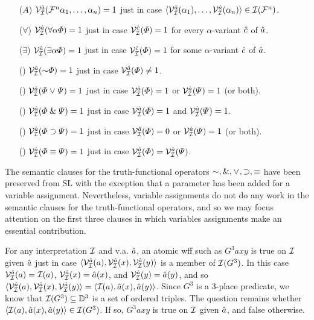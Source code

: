 \begin{enumerate}[labelsep=.15in]
  \item[($A$)] $\mathcal{V}_{\mathcal{I}}^{\hat{a}}(\mathcal{F}^n\alpha_1,\ldots,\alpha_n)=1$ just in case $\langle\mathcal{V}_{\mathcal{I}}^{\hat{a}}{(\alpha_1)},\ldots,\mathcal{V}_{\mathcal{I}}^{\hat{a}}{(\alpha_n)}\rangle\in\mathcal{I}(\mathcal{F}^n)$.
  \item[(\hspace{1pt}$\forall$\hspace{1pt})] $\mathcal{V}_{\mathcal{I}}^{\hat{a}}(\forall \alpha\varPhi)=1$ just in case $\mathcal{V}_{\mathcal{I}}^{\hat{c}}(\varPhi)=1$ for every $\alpha$-variant $\hat{c}$ of $\hat{a}$.
  \item[(\hspace{1pt}$\exists$\hspace{1pt})] $\mathcal{V}_{\mathcal{I}}^{\hat{a}}(\exists \alpha\varPhi)=1$ just in case $\mathcal{V}_{\mathcal{I}}^{\hat{c}}(\varPhi)=1$ for some $\alpha$-variant $\hat{c}$ of $\hat{a}$.
  \item[(\enot)] $\VV{\I}{\va{a}}(\enot\metaA{})=1$ just in case $\mathcal{V}_{\mathcal{I}}^{\hat{a}}(\varPhi{})\neq 1$.
  \item[(\eor)] $\mathcal{V}_{\mathcal{I}}^{\hat{a}}(\varPhi{} \mkern1mu\vee\mkern1mu \varPsi{})=1$ just in case $\mathcal{V}_{\mathcal{I}}^{\hat{a}}(\varPhi{})=1$ or $\mathcal{V}_{\mathcal{I}}^{\hat{a}}(\varPsi{})=1$ (or both).
  \item[(\eand)] $\mathcal{V}_{\mathcal{I}}^{\hat{a}}(\varPhi{} \mathrel\& \varPsi{})=1$ just in case $\mathcal{V}_{\mathcal{I}}^{\hat{a}}(\varPhi{})=1$ and $\mathcal{V}_{\mathcal{I}}^{\hat{a}}(\varPsi{})=1$.
  \item[(\eif)] $\mathcal{V}_{\mathcal{I}}^{\hat{a}}(\varPhi{} \supset \varPsi{})=1$ just in case $\mathcal{V}_{\mathcal{I}}^{\hat{a}}(\varPhi{})=0$ or $\mathcal{V}_{\mathcal{I}}^{\hat{a}}(\varPsi{})=1$ (or both).
  \item[(\eiff)] $\mathcal{V}_{\mathcal{I}}^{\hat{a}}(\varPhi{} \equiv \varPsi{})=1$ just in case $\mathcal{V}_{\mathcal{I}}^{\hat{a}}(\varPhi{})=\mathcal{V}_{\mathcal{I}}^{\hat{a}}(\varPsi{})$.
\end{enumerate}

The semantic clauses for the truth-functional operators $\enot,\eand,\eor,\eif,\eiff$ have been preserved from SL with the exception that a parameter has been added for a variable assignment. 
Nevertheless, variable assignments do not do any work in the semantic clauses for the truth-functional operators, and so we may focus attention on the first three clauses in which variables assignments make an essential contribution.

For any interpretation $\mathcal{I}$ and v.a. $\hat{a}$, an atomic wff such as $G^3axy$ is true on $\mathcal{I}$ given $\hat{a}$ just in case $\langle\mathcal{V}_{\mathcal{I}}^{\hat{a}}(a),\mathcal{V}_{\mathcal{I}}^{\hat{a}}(x),\mathcal{V}_{\mathcal{I}}^{\hat{a}}(y)\rangle$ is a member of $\mathcal{I}(G^3)$.
In this case $\mathcal{V}_{\mathcal{I}}^{\hat{a}}(a)=\mathcal{I}(a)$, $\mathcal{V}_{\mathcal{I}}^{\hat{a}}(x)=\hat{a}(x)$, and $\mathcal{V}_{\mathcal{I}}^{\hat{a}}(y)=\hat{a}(y)$, and so $\langle\mathcal{V}_{\mathcal{I}}^{\hat{a}}(a),\mathcal{V}_{\mathcal{I}}^{\hat{a}}(x),\mathcal{V}_{\mathcal{I}}^{\hat{a}}(y)\rangle=\langle\mathcal{I}(a),\hat{a}(x),\hat{a}(y)\rangle$. 
Since $G^3$ is a $3$-place predicate, we know that $\mathcal{I}(G^3)\subseteq \mathbb{D}^3$ is a set of ordered triples. 
The question remains whether $\langle\mathcal{I}(a),\hat{a}(x),\hat{a}(y)\rangle\in\mathcal{I}(G^3)$.
If so, $G^3axy$ is true on $\mathcal{I}$ given $\hat{a}$, and false otherwise.

